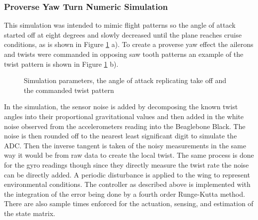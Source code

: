 \documentclass[11pt]{ucthesis}
\begin{document}
\subsubsection{Proverse Yaw Turn Numeric Simulation}
This simulation was intended to mimic flight patterns so the angle of attack started off at eight degrees and slowly decreased until the plane reaches cruise conditions, as is shown in Figure \ref{fig:yaw} a). To create a proverse yaw effect the ailerons and twists were commanded in opposing saw tooth patterns an example of the twist pattern is shown in Figure \ref{fig:yaw} b). 

\begin{figure}[thpb]
\hfill
{}
\hfill
{}
\hfill
\caption{Simulation parameters, the angle of attack replicating take off and the commanded twist pattern}
\label{fig:yaw}
\end{figure}

In the simulation, the sensor noise is added by decomposing the known twist angles into their proportional gravitational values and then added in the white noise observed from the accelerometers reading into the Beaglebone Black. The noise is then rounded off to the nearest least significant digit to simulate the ADC. Then the inverse tangent is taken of the noisy measurements in the same way it would be from raw data to create the local twist. The same process is done for the gyro readings though since they directly measure the twist rate the noise can be directly added. A periodic disturbance is applied to the wing to represent environmental conditions. The controller as described above is implemented with the integration of the error being done by a fourth order Runge-Kutta method. There are also sample times enforced for the actuation, sensing, and estimation of the state matrix.
\end{document}

